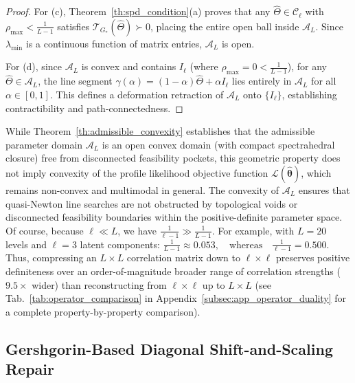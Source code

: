 \documentclass[default,sn-mathphys,Numbered]{sn-jnl}
\theoremstyle{thmstyleone}
\theoremstyle{thmstylethree}
\theoremstyle{thmstyletwo}
\begin{document}
\begin{proof}
For (c), Theorem~\ref{th:spd_condition}(a) proves that any $\hat{\Theta} \in \mathcal{C}_\ell$ with $\rho_{\max} < \frac{1}{L-1}$ satisfies $\mathcal{T}_{G_*}(\hat{\Theta}) \succ 0$, placing the entire open ball inside $\mathcal{A}_L$. Since $\lambda_{\min}$ is a continuous function of matrix entries, $\mathcal{A}_L$ is open.

For (d), since $\mathcal{A}_L$ is convex and contains $I_\ell$ (where $\rho_{\max} = 0 < \frac{1}{L-1}$), for any $\hat{\Theta} \in \mathcal{A}_L$, the line segment $\gamma(\alpha) = (1-\alpha)\hat{\Theta} + \alpha I_\ell$ lies entirely in $\mathcal{A}_L$ for all $\alpha \in [0, 1]$. This defines a deformation retraction of $\mathcal{A}_L$ onto $\{I_\ell\}$, establishing contractibility and path-connectedness.
\end{proof}


While Theorem~\ref{th:admissible_convexity} establishes that the admissible parameter domain $\mathcal{A}_L$ is an open convex domain (with compact spectrahedral closure) free from disconnected feasibility pockets, this geometric property does not imply convexity of the profile likelihood objective function $\mathcal{L}(\hat{\bm{\theta}})$, which remains non-convex and multimodal in general. The convexity of $\mathcal{A}_L$ ensures that quasi-Newton line searches are not obstructed by topological voids or disconnected feasibility boundaries within the positive-definite parameter space.
Of course, because $\ell \ll L$, we have $\frac{1}{\ell - 1} \gg \frac{1}{L - 1}$. For example, with $L = 20$ levels and $\ell = 3$ latent components:
$\frac{1}{L - 1} \approx 0.053, \quad \text{whereas} \quad \frac{1}{\ell - 1} = 0.500.
$ 
Thus, compressing an $L \times L$ correlation matrix down to $\ell \times \ell$ preserves positive definiteness over an order-of-magnitude broader range of correlation strengths ($9.5\times$ wider) than reconstructing from $\ell \times \ell$ up to $L \times L$ (see Tab.~\ref{tab:operator_comparison} in Appendix~\ref{subsec:app_operator_duality} for a complete property-by-property comparison).


\subsection{Gershgorin-Based Diagonal Shift-and-Scaling Repair}
\label{subsec:repair_operators}
\end{document}
